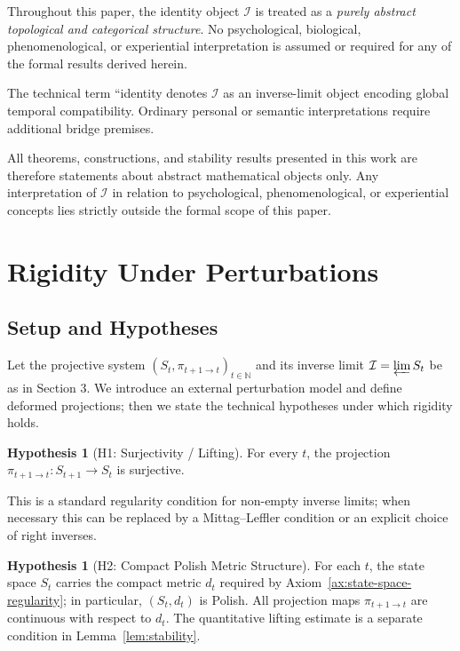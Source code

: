 \documentclass[11pt,a4paper]{article}
\theoremstyle{plain}
\theoremstyle{definition}
\newtheorem{hypothesis}[theorem]{Hypothesis}
\theoremstyle{remark}
\begin{document}
Throughout this paper, the identity object $\mathcal{I}$ is treated as a \textit{purely abstract topological and categorical structure}. No psychological, biological, phenomenological, or experiential interpretation is assumed or required for any of the formal results derived herein.

The technical term ``identity denotes $\mathcal{I}$ as an inverse-limit object encoding global temporal compatibility. Ordinary personal or semantic interpretations require additional bridge premises.

All theorems, constructions, and stability results presented in this work are therefore statements about abstract mathematical objects only. Any interpretation of $\mathcal{I}$ in relation to psychological, phenomenological, or experiential concepts lies strictly outside the formal scope of this paper.

\section{Rigidity Under Perturbations}

\subsection{Setup and Hypotheses}

Let the projective system $(S_t, \pi_{t+1 \to t})_{t \in \mathbb{N}}$ and its inverse limit $\mathcal{I} = \varprojlim S_t$ be as in Section 3. We introduce an external perturbation model and define deformed projections; then we state the technical hypotheses under which rigidity holds.

\begin{hypothesis}[H1: Surjectivity / Lifting]\label{hyp:h1}
For every $t$, the projection $\pi_{t+1 \to t}: S_{t+1} \to S_t$ is surjective.
\end{hypothesis}

This is a standard regularity condition for non-empty inverse limits; when necessary this can be replaced by a Mittag--Leffler condition or an explicit choice of right inverses.

\begin{hypothesis}[H2: Compact Polish Metric Structure]\label{hyp:h2}
For each $t$, the state space $S_t$ carries the compact metric $d_t$ required by Axiom~\ref{ax:state-space-regularity}; in particular, $(S_t,d_t)$ is Polish. All projection maps $\pi_{t+1 \to t}$ are continuous with respect to $d_t$. The quantitative lifting estimate is a separate condition in Lemma~\ref{lem:stability}.
\end{hypothesis}
\end{document}
